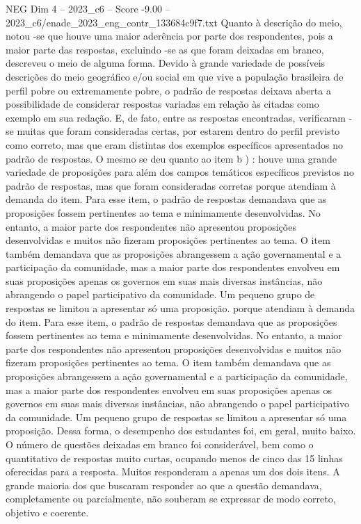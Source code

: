 \begin{textsample}{NEG Dim 4 – 2023\_c6 – Score -9.00 – 2023\_c6/enade\_2023\_eng\_contr\_133684c9f7.txt}
Quanto à descrição do meio, notou -se que houve uma maior aderência por parte dos respondentes, pois a maior parte das respostas, excluindo -se as que foram deixadas em branco, descreveu o meio de alguma forma.
Devido à grande variedade de possíveis descrições do meio geográfico e/ou social em que vive a população brasileira de perfil pobre ou extremamente pobre, o padrão de respostas deixava aberta a possibilidade de considerar respostas variadas em relação às citadas como exemplo em sua redação.
E, de fato, entre as respostas encontradas, verificaram -se muitas que foram consideradas certas, por estarem dentro do perfil previsto como correto, mas que eram distintas dos exemplos específicos apresentados no padrão de respostas.
O mesmo se deu quanto ao item b ) : houve uma grande variedade de proposições para além dos campos temáticos específicos previstos no padrão de respostas, mas que foram consideradas corretas porque atendiam à demanda do item.
Para esse item, o padrão de respostas demandava que as proposições fossem pertinentes ao tema e minimamente desenvolvidas.
No entanto, a maior parte dos respondentes não apresentou proposições desenvolvidas e muitos não fizeram proposições pertinentes ao tema.
O item também demandava que as proposições abrangessem a ação governamental e a participação da comunidade, mas a maior parte dos respondentes envolveu em suas proposições apenas os governos em suas mais diversas instâncias, não abrangendo o papel participativo da comunidade.
Um pequeno grupo de respostas se limitou a apresentar só uma proposição. porque atendiam à demanda do item.
Para esse item, o padrão de respostas demandava que as proposições fossem pertinentes ao tema e minimamente desenvolvidas.
No entanto, a maior parte dos respondentes não apresentou proposições desenvolvidas e muitos não fizeram proposições pertinentes ao tema.
O item também demandava que as proposições abrangessem a ação governamental e a participação da comunidade, mas a maior parte dos respondentes envolveu em suas proposições apenas os governos em suas mais diversas instâncias, não abrangendo o papel participativo da comunidade.
Um pequeno grupo de respostas se limitou a apresentar só uma proposição.
Dessa forma, o desempenho dos estudantes foi, em geral, muito baixo.
O número de questões deixadas em branco foi considerável, bem como o quantitativo de respostas muito curtas, ocupando menos de cinco das 15 linhas oferecidas para a resposta.
Muitos responderam a apenas um dos dois itens.
A grande maioria dos que buscaram responder ao que a questão demandava, completamente ou parcialmente, não souberam se expressar de modo correto, objetivo e coerente.

\end{textsample}
